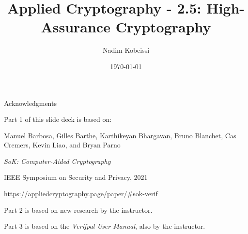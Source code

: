 \ifdefined\PRESENTATION\else\PassOptionsToClass{handout}{beamer}\fi\documentclass[aspectratio=169, lualatex]{beamer}
\title{Applied Cryptography - 2.5: High-Assurance Cryptography}
\author{Nadim Kobeissi}
\institute{Symbolic Software}
\date{\today}
\begin{document}
\begin{frame}[plain]
	\titlepage
\end{frame}

\begin{frame}{Acknowledgments}
	\begin{center}
		\Large
		Part 1 of this slide deck is based on:

		\vspace{0.5em}

		\normalsize
		Manuel Barbosa, Gilles Barthe, Karthikeyan Bhargavan, Bruno Blanchet, Cas Cremers, Kevin Liao, and Bryan Parno

		\vspace{0.5em}

		\textit{SoK: Computer-Aided Cryptography}

		\vspace{0.5em}

		IEEE Symposium on Security and Privacy, 2021

		\vspace{0.5em}

		\url{https://appliedcryptography.page/paper/\#sok-verif}

		\vspace{1em}

		Part 2 is based on new research by the instructor.

		\vspace{1em}

		Part 3 is based on the \textit{Verifpal User Manual}, also by the instructor.
	\end{center}
\end{frame}
\end{document}
